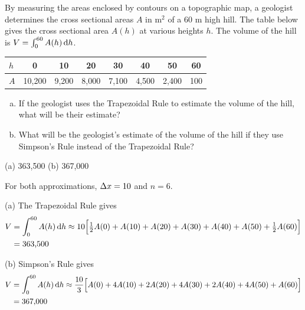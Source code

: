 \begin{Mquestion}[2001A]
By measuring the areas enclosed by contours on a topographic map, a geologist
determines the cross sectional areas $A$ in $\mathrm{m}^2$ of a $60$ m high
hill. The table below gives the cross sectional area $A(h)$ at various
heights $h$. The volume of the hill is $V=\int_0^{60} A(h)\,\mathrm{d}h$.

\renewcommand{\arraystretch}{1.1}
\begin{center}
     \begin{tabular}{|l|c|c|c|c|c|c|c|}
          \hline
          $h$ &0&10&20&30&40&50&60  \\
          \hline
          $A$ &10,200&9,200&8,000&7,100&4,500&2,400&100\\
          \hline
     \end{tabular}
\end{center}
\renewcommand{\arraystretch}{1.0}

\begin{enumerate}[(a)]
\item
If the geologist uses the Trapezoidal Rule to estimate the
volume of the hill, what will be their estimate?
\item
What will be the geologist's estimate of the volume of the
hill if they use Simpson's Rule instead of the Trapezoidal Rule?
\end{enumerate}
\end{Mquestion}

\begin{answer}
(a) 363,500
\qquad (b) 367,000
\end{answer}

\begin{solution}
For both approximations, $\Delta x = 10$ and $n=6$.

 (a)
The Trapezoidal Rule gives
\begin{align*}
V&=\int_0^{60} A(h)\,\mathrm{d}h
\approx 10\Big[\tfrac{1}{2} A(0)+A(10)+A(20)+A(30)+A(40)+A(50)+\tfrac{1}{2} A(60)\Big] \\
&=\text{363,500}
\end{align*}

\noindent (b)
Simpson's Rule gives
\begin{align*}
V&=\int_0^{60} A(h)\,\mathrm{d}h
\approx \frac{10}{3}\Big[A(0)+4A(10)+2A(20)+4A(30)+2A(40)+4A(50)+A(60)\Big]\\
&=\text{367,000}
\end{align*}

\end{solution}


